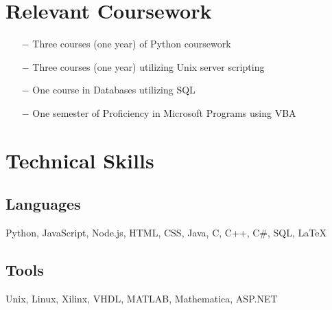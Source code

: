 \documentclass[10pt]{article}
\begin{document}
\section{Relevant Coursework}

\begin{itemize}
	\item[$-$] Three courses (one year) of Python coursework
	\item[$-$] Three courses (one year) utilizing Unix server scripting
	\item[$-$] One course in Databases utilizing SQL
	\item[$-$] One semester of Proficiency in Microsoft Programs using VBA
\end{itemize}

\section{Technical Skills}

\subsection{Languages}

Python, JavaScript, Node.js, HTML, CSS, Java, C, C++, C\#, SQL, \LaTeX

\subsection{Tools}

Unix, Linux, Xilinx, VHDL, MATLAB, Mathematica, ASP.NET
\end{document}
